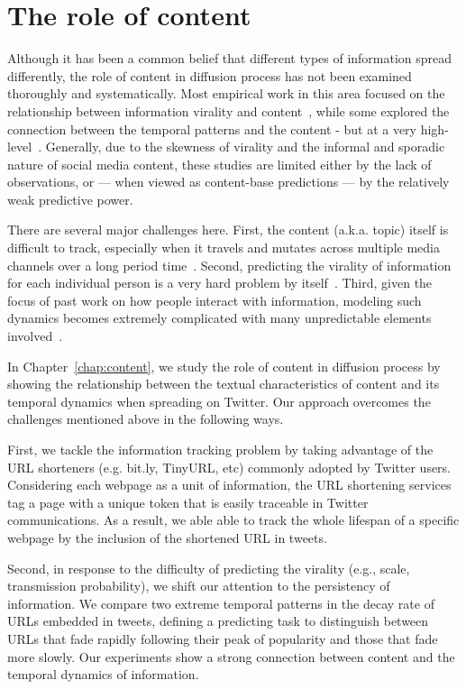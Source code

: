 \documentclass[phd,tocprelim]{cornell}
\begin{document}
\section{The role of content}
Although it has been a common belief that different types of information spread differently, the role of content in diffusion process has not been examined thoroughly and systematically. Most empirical work in this area focused on the relationship between information virality and content~\cite{Berger-2010,Hansen:11}, while some explored the connection between the temporal patterns and the content - but at a very high-level~\cite{Gruhl-2004,crane:2008}. Generally, due to the skewness of virality and the informal and sporadic nature of social media content, these studies are limited either by the lack of observations, or --- when viewed as content-base predictions --- by the relatively weak predictive power. 



There are several major challenges here. First, the content (a.k.a. topic) itself is difficult to track, especially when it travels and mutates across multiple media channels over a long period time~\cite{Leskovec-Newscycle-2009}.  Second, predicting the virality of information for each individual person is a very hard problem by itself~\cite{Bakshy-2011,Szabo-2010}. Third, given the focus of past work on how people interact with information, modeling such dynamics becomes extremely complicated with many unpredictable elements involved~\cite{yang-2010,Yang-2011,Wu-Twitter-2011,Bakshy-2011}. 

In Chapter~\ref{chap:content}, we study the role of content in diffusion process by showing the relationship between the textual characteristics of content and its temporal dynamics when spreading on Twitter. Our approach overcomes the challenges mentioned above in the following ways. 

First, we tackle the information tracking problem by taking advantage of the URL shorteners (e.g. bit.ly, TinyURL, etc) commonly adopted by Twitter users. Considering each webpage as a unit of information, the URL shortening services tag a page with a unique token that is easily traceable in Twitter communications. As a result, we able able to track the whole lifespan of a specific webpage by the inclusion of the shortened URL in tweets. 

Second, in response to the difficulty of predicting the virality (e.g., scale, transmission probability), we shift our attention to the persistency of information. We compare two extreme temporal patterns in the decay rate of URLs embedded in tweets, defining a predicting task to distinguish between URLs that fade rapidly following their peak of popularity and those that fade more slowly. Our experiments show a strong connection between content and the temporal dynamics of information.
\end{document}
